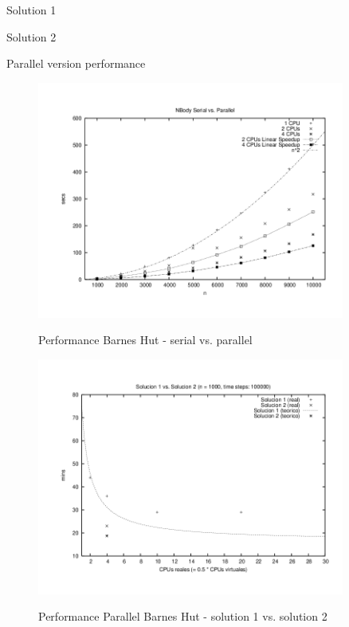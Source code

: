  {Solution 1}

 {Solution 2}

 {Parallel version performance}

\begin{figure}[!htbp]
  \centering
  \includegraphics[origin=c,width=0.9\textwidth]{graphics/performance_serial_vs_parallel.png}
  \label{fig:perf-bh-mpi2}
  \caption{Performance Barnes Hut - serial vs. parallel}
\end{figure}


\begin{figure}[!htbp]
  \centering
  \includegraphics[origin=c,width=0.9\textwidth]{graphics/solution1_vs_solution2.png}
  \label{fig:perf-bh-mpi1}
  \caption{Performance Parallel Barnes Hut - solution 1 vs. solution 2}
\end{figure}




